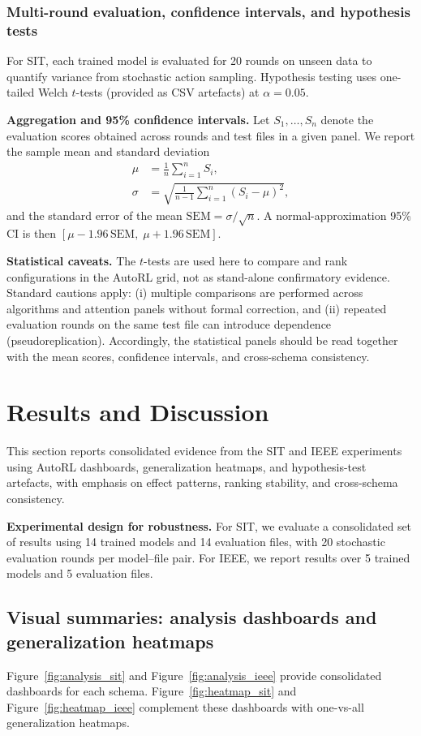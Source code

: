 \documentclass[sn-basic]{sn-jnl} %
\begin{document}
\subsubsection{Multi-round evaluation, confidence intervals, and hypothesis tests}
For SIT, each trained model is evaluated for 20 rounds on unseen data to quantify variance from stochastic action sampling. Hypothesis testing uses one-tailed Welch $t$-tests (provided as CSV artefacts) at $\alpha=0.05$.

\textbf{Aggregation and 95\% confidence intervals.}
Let $S_1,\ldots,S_n$ denote the evaluation scores obtained across rounds and test files in a given panel. We report the sample mean and standard deviation
\begin{align}
\mu &= \frac{1}{n}\sum_{i=1}^{n} S_i,\\
\sigma &= \sqrt{\frac{1}{n-1}\sum_{i=1}^{n}(S_i-\mu)^2},
\end{align}
and the standard error of the mean $\mathrm{SEM}=\sigma/\sqrt{n}$. A normal-approximation 95\% CI is then $[\mu-1.96\,\mathrm{SEM},\;\mu+1.96\,\mathrm{SEM}]$.

\textbf{Statistical caveats.}
The $t$-tests are used here to compare and rank configurations in the AutoRL grid, not as stand-alone confirmatory evidence. Standard cautions apply: (i) multiple comparisons are performed across algorithms and attention panels without formal correction, and (ii) repeated evaluation rounds on the same test file can introduce dependence (pseudoreplication). Accordingly, the statistical panels should be read together with the mean scores, confidence intervals, and cross-schema consistency.

\section{Results and Discussion}
\label{sec:results}
This section reports consolidated evidence from the SIT and IEEE experiments using AutoRL dashboards, generalization heatmaps, and hypothesis-test artefacts, with emphasis on effect patterns, ranking stability, and cross-schema consistency.

\textbf{Experimental design for robustness.}
For SIT, we evaluate a consolidated set of results using 14 trained models and 14 evaluation files, with 20 stochastic evaluation rounds per model--file pair. For IEEE, we report results over 5 trained models and 5 evaluation files.

\subsection{Visual summaries: analysis dashboards and generalization heatmaps}
Figure~\ref{fig:analysis_sit} and Figure~\ref{fig:analysis_ieee} provide consolidated dashboards for each schema. Figure~\ref{fig:heatmap_sit} and Figure~\ref{fig:heatmap_ieee} complement these dashboards with one-vs-all generalization heatmaps.
\end{document}
